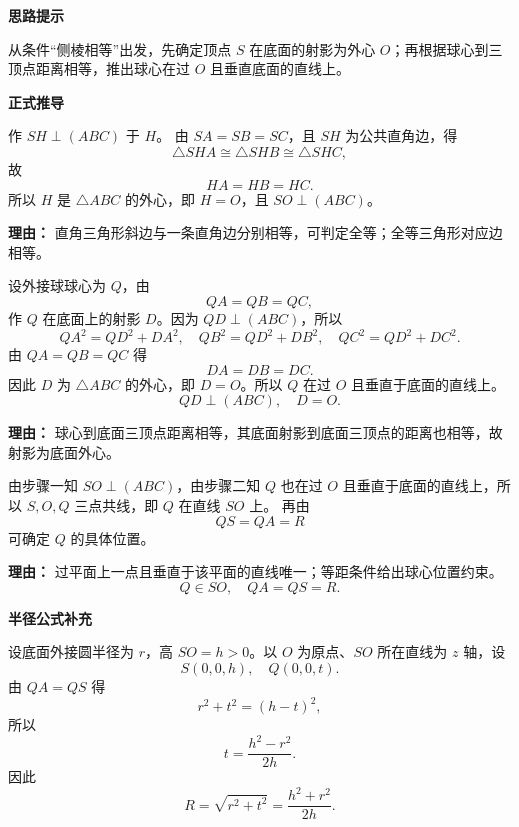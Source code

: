 \begin{proofbox}
	\textbf{\textcolor{CProof}{思路提示}}

	从条件“侧棱相等”出发，先确定顶点 $S$ 在底面的射影为外心 $O$；再根据球心到三顶点距离相等，推出球心在过 $O$ 且垂直底面的直线上。

	\medskip
	\textbf{\textcolor{CProof}{正式推导}}
	\begin{description}[style=nextline, leftmargin=2.8em, labelsep=0.5em, itemsep=0.55em]
		\item[\textbf{步骤一（射影定位）：}] 作 $SH\perp(ABC)$ 于 $H$。
		      由 $SA=SB=SC$，且 $SH$ 为公共直角边，得
		      \[
			      \triangle SHA \cong \triangle SHB \cong \triangle SHC,
		      \]
		      故
		      \[
			      HA=HB=HC.
		      \]
		      所以 $H$ 是 $\triangle ABC$ 的外心，即 $H=O$，且 $SO\perp(ABC)$。
		      \par\textbf{理由：} 直角三角形斜边与一条直角边分别相等，可判定全等；全等三角形对应边相等。

		\item[\textbf{步骤二（球心定位）：}] 设外接球球心为 $Q$，由
		      \[
			      QA=QB=QC,
		      \]
		      作 $Q$ 在底面上的射影 $D$。因为 $QD\perp(ABC)$，所以
		      \[
			      QA^{2}=QD^{2}+DA^{2},\quad
			      QB^{2}=QD^{2}+DB^{2},\quad
			      QC^{2}=QD^{2}+DC^{2}.
		      \]
		      由 $QA=QB=QC$ 得
		      \[
			      DA=DB=DC.
		      \]
		      因此 $D$ 为 $\triangle ABC$ 的外心，即 $D=O$。所以 $Q$ 在过 $O$ 且垂直于底面的直线上。
		      \[
			      QD\perp (ABC),\quad D=O.
		      \]
		      \par\textbf{理由：} 球心到底面三顶点距离相等，其底面射影到底面三顶点的距离也相等，故射影为底面外心。

		\item[\textbf{步骤三（共线确认）：}] 由步骤一知 $SO\perp(ABC)$，由步骤二知 $Q$ 也在过 $O$ 且垂直于底面的直线上，所以 $S,O,Q$ 三点共线，即 $Q$ 在直线 $SO$ 上。
		      再由
		      \[
			      QS=QA=R
		      \]
		      可确定 $Q$ 的具体位置。
		      \par\textbf{理由：} 过平面上一点且垂直于该平面的直线唯一；等距条件给出球心位置约束。
		      \[
			      Q\in SO,\quad QA=QS=R.
		      \]
	\end{description}

	\medskip
	\textbf{\textcolor{CProof}{半径公式补充}}

	设底面外接圆半径为 $r$，高 $SO=h>0$。以 $O$ 为原点、$SO$ 所在直线为 $z$ 轴，设
	\[
		S(0,0,h),\quad Q(0,0,t).
	\]
	由 $QA=QS$ 得
	\[
		r^{2}+t^{2}=(h-t)^{2},
	\]
	所以
	\[
		t=\frac{h^{2}-r^{2}}{2h}.
	\]
	因此
	\[
		R=\sqrt{r^{2}+t^{2}}
		=\frac{h^{2}+r^{2}}{2h}.
	\]


\end{proofbox}
